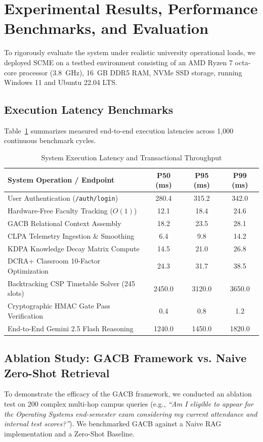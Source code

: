 \documentclass[11pt,a4paper]{article}
\begin{document}
\section{Experimental Results, Performance Benchmarks, and Evaluation}
\label{sec:results}

To rigorously evaluate the system under realistic university operational loads, we deployed SCME on a testbed environment consisting of an AMD Ryzen 7 octa-core processor (3.8~GHz), 16~GB DDR5 RAM, NVMe SSD storage, running Windows 11 and Ubuntu 22.04 LTS.

\subsection{Execution Latency Benchmarks}
Table~\ref{tab:benchmarks} summarizes measured end-to-end execution latencies across 1,000 continuous benchmark cycles.

\begin{table}[h]
\centering
\caption{System Execution Latency and Transactional Throughput}
\label{tab:benchmarks}
\begin{tabular}{lccc}
\toprule
\textbf{System Operation / Endpoint} & \textbf{P50 (ms)} & \textbf{P95 (ms)} & \textbf{P99 (ms)} \\
\midrule
User Authentication (\texttt{/auth/login}) & 280.4 & 315.2 & 342.0 \\
Hardware-Free Faculty Tracking ($O(1)$) & 12.1 & 18.4 & 24.6 \\
GACB Relational Context Assembly & 18.2 & 23.5 & 28.1 \\
CLPA Telemetry Ingestion \& Smoothing & 6.4 & 9.8 & 14.2 \\
KDPA Knowledge Decay Matrix Compute & 14.5 & 21.0 & 26.8 \\
DCRA+ Classroom 10-Factor Optimization & 24.3 & 31.7 & 38.5 \\
Backtracking CSP Timetable Solver (245 slots) & 2450.0 & 3120.0 & 3650.0 \\
Cryptographic HMAC Gate Pass Verification & 0.4 & 0.8 & 1.2 \\
End-to-End Gemini 2.5 Flash Reasoning & 1240.0 & 1450.0 & 1820.0 \\
\bottomrule
\end{tabular}
\end{table}

\subsection{Ablation Study: GACB Framework vs. Naive Zero-Shot Retrieval}
To demonstrate the efficacy of the GACB framework, we conducted an ablation test on 200 complex multi-hop campus queries (e.g., \emph{``Am I eligible to appear for the Operating Systems end-semester exam considering my current attendance and internal test scores?''}). We benchmarked GACB against a Naive RAG implementation and a Zero-Shot Baseline.
\end{document}
